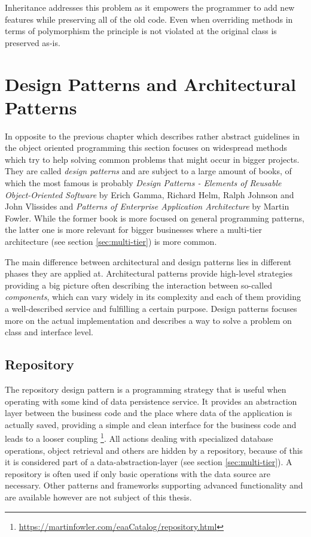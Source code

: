 Inheritance addresses this problem as it empowers the programmer to add new features while preserving all of the old code. Even when overriding methods in terms of polymorphism the principle is not violated at the original class is preserved as-is. 



\section{Design Patterns and Architectural Patterns}
In opposite to the previous chapter which describes rather abstract guidelines in the object oriented programming this section focuses on widespread methods which try to help solving common problems that might occur in bigger projects. They are called \emph{design patterns} and are subject to a large amount of books, of which the most famous is probably \emph{Design Patterns - Elements of Reusable Object-Oriented Software} by Erich Gamma, Richard Helm, Ralph Johnson and John Vlissides and \emph{Patterns of Enterprise Application Architecture} by Martin Fowler. While the former book is more focused on general programming patterns, the latter one is more relevant for bigger businesses where a multi-tier architecture (see section \ref{sec:multi-tier}) is more common. 

The main difference between architectural and design patterns lies in different phases they are applied at. Architectural patterns provide high-level strategies providing a big picture often describing the interaction between so-called \emph{components}, which can vary widely in its complexity and each of them providing a well-described service and fulfilling a certain purpose. Design patterns focuses more on the actual implementation and describes a way to solve a problem on class and interface level. 

\subsection{Repository}
\label{sec:repository}
The repository design pattern is a programming strategy that is useful when operating with some kind of data persistence service. It provides an abstraction layer between the business code and the place where data of the application is actually saved, providing a simple and clean interface for the business code and leads to a looser coupling \footnote{\href{https://martinfowler.com/eaaCatalog/repository.html}{https://martinfowler.com/eaaCatalog/repository.html}}. All actions dealing with specialized database operations, object retrieval and others are hidden by a repository, because of this it is considered part of a data-abstraction-layer (see section \ref{sec:multi-tier}). A repository is often used if only basic operations with the data source are necessary. Other patterns and frameworks supporting advanced functionality and are available however are not subject of this thesis.

